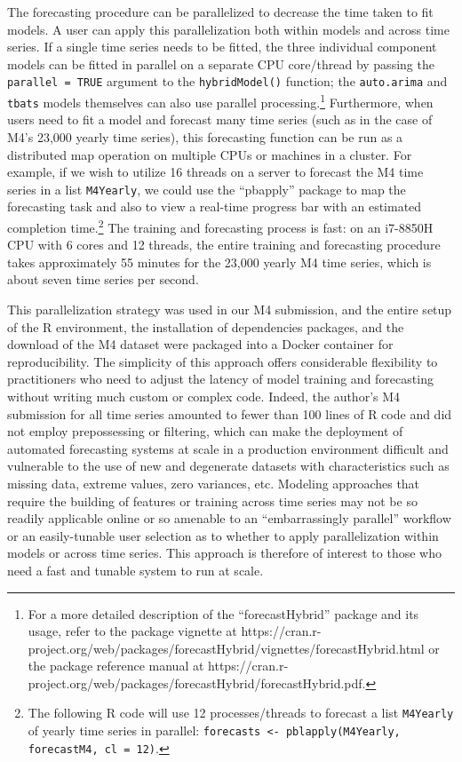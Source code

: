 \documentclass[11pt,3p,review,authoryear]{elsarticle}
\begin{document}
The forecasting procedure can be parallelized to decrease the time taken to fit models. A user can apply this parallelization both within models and across time series. If a single time series needs to be fitted, the three individual component models can be fitted in parallel on a separate CPU core/thread by passing the \texttt{parallel = TRUE} argument to the \texttt{hybridModel()} function; the \texttt{auto.arima} and \texttt{tbats} models themselves can also use parallel processing.\footnote{For a more detailed description of the ``forecastHybrid'' package and its usage, refer to the package vignette at https://cran.r-project.org/web/packages/forecastHybrid/vignettes/forecastHybrid.html or the package reference manual at https://cran.r-project.org/web/packages/forecastHybrid/forecastHybrid.pdf.} Furthermore, when users need to fit a model and forecast many time series (such as in the case of M4's 23,000 yearly time series), this forecasting function can be run as a distributed map operation on multiple CPUs or machines in a cluster. For example, if we wish to utilize 16 threads on a server to forecast the M4 time series in a list \texttt{M4Yearly}, we could use the ``pbapply'' package \citep{pbapply} to map the forecasting task and also to view a real-time progress bar with an estimated completion time.\footnote{The following R code will use 12 processes/threads to forecast a list \texttt{M4Yearly} of yearly time series in parallel: \texttt{forecasts <- pblapply(M4Yearly, forecastM4, cl = 12)}.} The training and forecasting process is fast: on an i7-8850H CPU with 6 cores and 12 threads, the entire training and forecasting procedure takes approximately 55 minutes for the 23,000 yearly M4 time series, which is about seven time series per second.


This parallelization strategy was used in our M4 submission, and the entire setup of the R environment, the installation of dependencies packages, and the download of the M4 dataset were packaged into a Docker container for reproducibility. The simplicity of this approach offers considerable flexibility to practitioners who need to adjust the latency of model training and forecasting without writing much custom or complex code. Indeed, the author's M4 submission for all time series amounted to fewer than 100 lines of R code and did not employ prepossessing or filtering, which can make the deployment of automated forecasting systems at scale in a production environment difficult and vulnerable to the use of new and degenerate datasets with characteristics such as missing data, extreme values, zero variances, etc. Modeling approaches that require the building of features or training across time series may not be so readily applicable online or so amenable to an ``embarrassingly parallel'' workflow or an easily-tunable user selection as to whether to apply parallelization within models or across time series. This approach is therefore of interest to those who need a fast and tunable system to run at scale.
\end{document}
